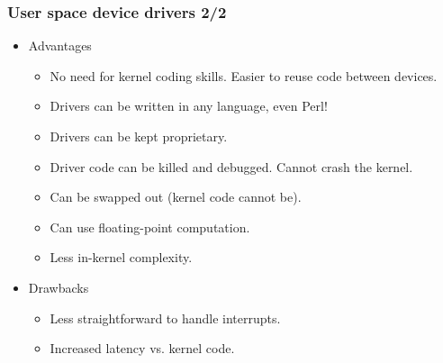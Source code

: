 \begin{frame}
  \frametitle{User space device drivers 2/2}
  \begin{itemize}
  \item Advantages
    \begin{itemize}
    \item No need for kernel coding skills. Easier to reuse code
      between devices.
    \item Drivers can be written in any language, even Perl!
    \item Drivers can be kept proprietary.
    \item Driver code can be killed and debugged. Cannot crash the
      kernel.
    \item Can be swapped out (kernel code cannot be).
    \item Can use floating-point computation.
    \item Less in-kernel complexity.
    \end{itemize}
  \item Drawbacks
    \begin{itemize}
    \item Less straightforward to handle interrupts.
    \item Increased latency vs. kernel code.
    \end{itemize}
  \end{itemize}
\end{frame}
